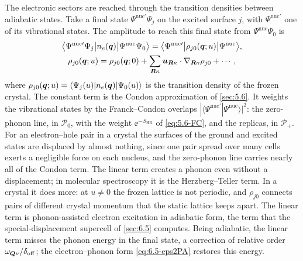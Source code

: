 The electronic sectors are reached through the transition densities between adiabatic states. Take a final state $\Psi^{\mathrm{nuc}\prime}\Psi_j$ on the excited surface $j$, with $\Psi^{\mathrm{nuc}\prime}$ one of its vibrational states. The amplitude to reach this final state from $\Psi^{\mathrm{nuc}}\Psi_0$ is
\begin{equation}
  \begin{gathered}
  \bigl\langle\Psi^{\mathrm{nuc}\prime}\Psi_j\big|n_e(\bm{q})\big|\Psi^{\mathrm{nuc}}\Psi_0\bigr\rangle = \bigl\langle\Psi^{\mathrm{nuc}\prime}\big|\rho_{j0}(\bm{q};u)\big|\Psi^{\mathrm{nuc}}\bigr\rangle , \\
  \rho_{j0}(\bm{q};u) = \rho_{j0}(\bm{q};0) + \sum_{\bm{R}\kappa}\bm{u}_{\bm{R}\kappa}\cdot\nabla_{\bm{R}\kappa}\rho_{j0} + \cdots ,
  \end{gathered}
  \label{eq:8.6-electronic}
\end{equation}
where $\rho_{j0}(\bm{q};u) = \langle\Psi_j(u)|n_e(\bm{q})|\Psi_0(u)\rangle$ is the transition density of the frozen crystal. The constant term is the Condon approximation of \cref{sec:5.6}. It weights the vibrational states by the Franck--Condon overlaps $|\langle\Psi^{\mathrm{nuc}\prime}|\Psi^{\mathrm{nuc}}\rangle|^2$: the zero-phonon line, in $\mathcal{P}_0$, with the weight $\ee^{-S_{\mathrm{HR}}}$ of \cref{eq:5.6-FC}, and the replicas, in $\mathcal{P}_+$. For an electron--hole pair in a crystal the surfaces of the ground and excited states are displaced by almost nothing, since one pair spread over many cells exerts a negligible force on each nucleus, and the zero-phonon line carries nearly all of the Condon term. The linear term creates a phonon even without a displacement; in molecular spectroscopy it is the Herzberg--Teller term. In a crystal it does more: at $u \neq 0$ the frozen lattice is not periodic, and $\rho_{j0}$ connects pairs of different crystal momentum that the static lattice keeps apart. The linear term is phonon-assisted electron excitation in adiabatic form, the term that the special-displacement supercell of \cref{sec:6.5} computes. Being adiabatic, the linear term misses the phonon energy in the final state, a correction of relative order $\omega_{\bm{Q}\nu}/\delta_{\mathrm{off}}$; the electron--phonon form \cref{eq:6.5-eps2PA} restores this energy.

